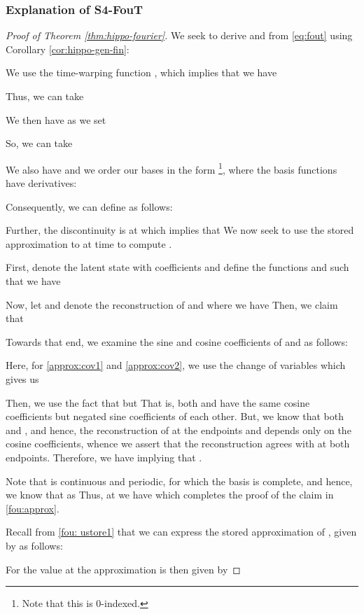 \documentclass{article}
\begin{document}
\subsubsection{Explanation of S4-FouT}



\begin{proof}[Proof of Theorem \ref{thm:hippo-fourier}]
 We seek to derive  and  from \eqref{eq:fout} using Corollary \ref{cor:hippo-gen-fin}: 
 
 We use the time-warping function , which implies that we have 
 
 Thus, we can take 
 
 
 We then have  as we set
 
 So, we can take 
 
 
 We also have  and we order our bases in the form \footnote{Note that this is 0-indexed.}, where the basis functions have derivatives:


Consequently, we can define   as follows: 


Further, the discontinuity is at  which implies that  We now seek to use the stored approximation to  at time  to compute .

First, denote the latent state  with coefficients  and define the functions  and  such that we have

Now, let  and  denote the reconstruction of  and  where we have
Then, we claim that 


Towards that end, we examine the sine and cosine coefficients of  and  as follows:

Here, for \eqref{approx:cov1} and \eqref{approx:cov2}, we use the change of variables  which gives us 

Then, we use the fact that  but  That is, both  and  have the same cosine coefficients but negated sine coefficients of each other. But, we know that both  and , and hence, the reconstruction of  at the endpoints  and  depends only on the cosine coefficients, whence we assert that the reconstruction  agrees with  at both endpoints. Therefore, we have  implying that .

Note that  is continuous and periodic, for which the basis  is complete, and hence, we know that as   Thus, at  we have  which completes the proof of the claim in \eqref{fou:approx}.



Recall from \eqref{fou: ustore1} that we can express the stored approximation of , given by  as follows:

For the value at  the approximation  is then given by


\end{proof}
\end{document}
